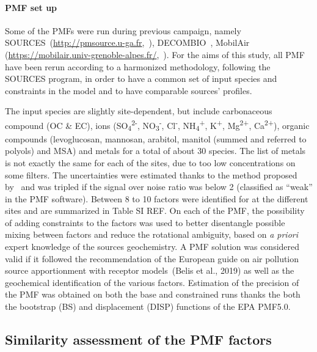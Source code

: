 \documentclass[acp]{copernicus}
\begin{document}
\paragraph{PMF set up}%
\label{pmf-set-up}

Some of the PMFs were run during previous campaign, namely
SOURCES~({\url{http://pmsource.u-ga.fr}},~\citet{favezTraitement2017,weberComparison2019}),
DECOMBIO~\citep{chevrierChauffage2016,chevrierDECOMBIOContribution2016}, MobilAir
(\url{https://mobilair.univ-grenoble-alpes.fr/},~\citet{borlazaFinescaleinprep.}).
For the aims of this study, all PMF have been rerun according to a
harmonized methodology, following the SOURCES program, in order to have
a common set of input species and constraints in the model and to have
comparable sources' profiles.

The input species are slightly site-dependent, but include carbonaceous
compound (OC \& EC), ions (SO\textsubscript{4}\textsuperscript{2-},
NO\textsubscript{3}\textsuperscript{-}, Cl\textsuperscript{-},
NH\textsubscript{4}\textsuperscript{+}, K\textsuperscript{+},
Mg\textsuperscript{2+}, Ca\textsuperscript{2+}), organic compounds
(levoglucosan, mannosan, arabitol, manitol (summed and referred to
polyols) and MSA) and metals for a total of about 30 species. The list
of metals is not exactly the same for each of the sites, due to too low
concentrations on some filters. The uncertainties were estimated thanks
to the method proposed by~\citet{gianiniComparative2012} and was tripled if the
signal over noise ratio was below 2 (classified as ``weak'' in the PMF
software). Between 8 to 10 factors were identified for at the different
sites and are summarized in Table SI REF. On each of the PMF, the
possibility of adding constraints to the factors was used to better
disentangle possible mixing between factors and reduce the rotational
ambiguity, based on \emph{a priori} expert knowledge of the sources
geochemistry. A PMF solution was considered valid if it followed the
recommendation of the European guide on air pollution source
apportionment with receptor models~(Belis et al., 2019) as well as the
geochemical identification of the various factors. Estimation of the
precision of the PMF was obtained on both the base and constrained runs
thanks the both the bootstrap (BS) and displacement (DISP) functions of
the EPA PMF5.0.

\subsection{Similarity assessment of the PMF factors}%
\label{similarity-assessment-of-the-pmf-factors}
\end{document}
